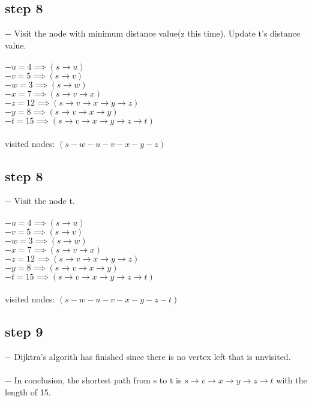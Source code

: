 \documentclass[12pt]{article}
\begin{document}
\subsection*{step 8}
	$-$ Visit the node with minimum distance value(z this time). Update t's distance value.\\
	\\
	$-$$u = 4 \implies (s \rightarrow u)$\\
	$-$$v = 5 \implies (s \rightarrow v)$\\
	$-$$w = 3 \implies (s \rightarrow w)$\\
	$-$$x = 7 \implies (s \rightarrow v \rightarrow x)$\\
	$-$$z = 12 \implies (s \rightarrow v \rightarrow x \rightarrow y \rightarrow z)$\\
	$-$$y = 8 \implies (s \rightarrow v \rightarrow x \rightarrow y)$\\
	$-$$t = 15 \implies (s \rightarrow v \rightarrow x \rightarrow y \rightarrow z \rightarrow t)$\\
	\\
	visited nodes: $(s-w-u-v-x-y-z)$\\

\subsection*{step 8}
	$-$ Visit the node t.\\
	\\
	$-$$u = 4 \implies (s \rightarrow u)$\\
	$-$$v = 5 \implies (s \rightarrow v)$\\
	$-$$w = 3 \implies (s \rightarrow w)$\\
	$-$$x = 7 \implies (s \rightarrow v \rightarrow x)$\\
	$-$$z = 12 \implies (s \rightarrow v \rightarrow x \rightarrow y \rightarrow z)$\\
	$-$$y = 8 \implies (s \rightarrow v \rightarrow x \rightarrow y)$\\
	$-$$t = 15 \implies (s \rightarrow v \rightarrow x \rightarrow y \rightarrow z \rightarrow t)$\\
	\\
	visited nodes: $(s-w-u-v-x-y-z-t)$\\

\subsection*{step 9}
	$-$ Dijktra's algorith has finished since there is no vertex left that is unvisited.\\
	\\
	$-$ In conclusion, the shortest path from s to t is $s \rightarrow v \rightarrow x \rightarrow y \rightarrow z \rightarrow t$ with the length of 15.\\
\end{document}
